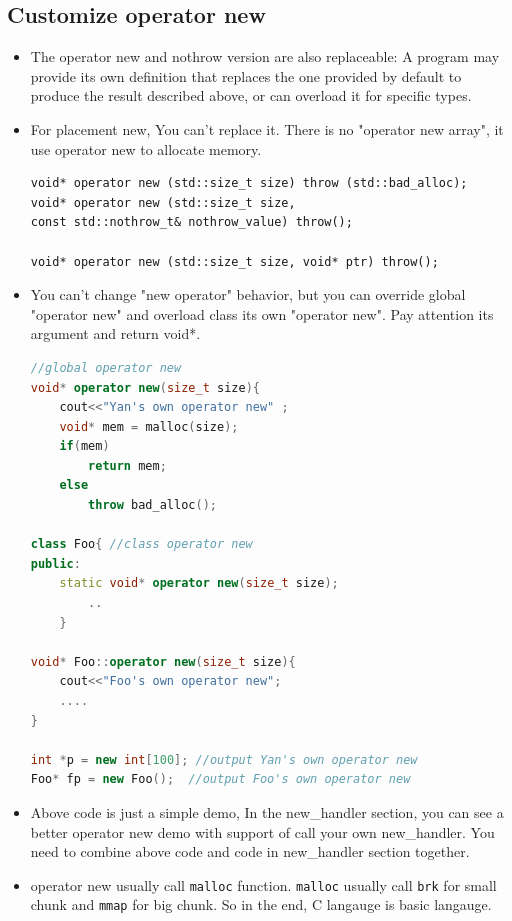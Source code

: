 \documentclass[a4paper,11pt,twoside]{book}
\begin{document}
\subsection{Customize operator new}
\begin{itemize}
	\item The operator new and nothrow version are also replaceable: A program may provide its own definition that replaces the one provided by default to produce the result described above, or can overload it for specific types. 
	
	\item For placement new, You can't replace it. There is no "operator new array", it use operator new to allocate memory. 
\begin{lstlisting}[numbers=none]
void* operator new (std::size_t size) throw (std::bad_alloc);
void* operator new (std::size_t size, 
const std::nothrow_t& nothrow_value) throw();

void* operator new (std::size_t size, void* ptr) throw();
\end{lstlisting}
	
	\item You can't change "new operator" behavior, but you can override global "operator new" and overload class its own "operator new". Pay attention its argument and return void*. 
	
\begin{lstlisting}[frame=single, language=c++, mathescape=true]
//global operator new
void* operator new(size_t size){
	cout<<"Yan's own operator new" ;
	void* mem = malloc(size);
	if(mem)
		return mem;
	else
		throw bad_alloc();
	
class Foo{ //class operator new
public:
	static void* operator new(size_t size);
		..
	}
	
void* Foo::operator new(size_t size){
	cout<<"Foo's own operator new";
	....
}
	
int *p = new int[100]; //output Yan's own operator new
Foo* fp = new Foo();  //output Foo's own operator new
\end{lstlisting}
	
	\item Above code is just a simple demo, In the new\_handler section, you can see a better operator new demo with support of call your own new\_handler. You need to combine above code and code in new\_handler section together. 
	
	\item operator new usually call \texttt{malloc} function. \texttt{malloc} usually call \texttt{brk} for small chunk and \texttt{mmap} for big chunk. So in the end, C langauge is basic langauge.
	

\end{itemize}
\end{document}
